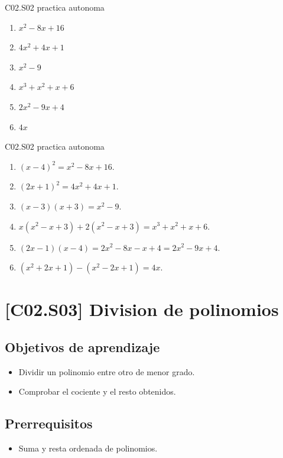 \begin{shortanswer}{C02.S02 practica autonoma}
\begin{enumerate}[label=\textbf{PX-C02.S02-\arabic*:}, leftmargin=*]
  \item \(x^2-8x+16\)
  \item \(4x^2+4x+1\)
  \item \(x^2-9\)
  \item \(x^3+x^2+x+6\)
  \item \(2x^2-9x+4\)
  \item \(4x\)
\end{enumerate}
\end{shortanswer}

\begin{fullsolution}{C02.S02 practica autonoma}
\begin{enumerate}[label=\textbf{PX-C02.S02-\arabic*:}, leftmargin=*]
  \item \((x-4)^2=x^2-8x+16\).
  \item \((2x+1)^2=4x^2+4x+1\).
  \item \((x-3)(x+3)=x^2-9\).
  \item \(x(x^2-x+3)+2(x^2-x+3)=x^3+x^2+x+6\).
  \item \((2x-1)(x-4)=2x^2-8x-x+4=2x^2-9x+4\).
  \item \((x^2+2x+1)-(x^2-2x+1)=4x\).
\end{enumerate}
\end{fullsolution}

\section{[C02.S03] Division de polinomios}

\subsection*{Objetivos de aprendizaje}
\begin{itemize}
  \item Dividir un polinomio entre otro de menor grado.
  \item Comprobar el cociente y el resto obtenidos.
\end{itemize}

\subsection*{Prerrequisitos}
\begin{itemize}
  \item Suma y resta ordenada de polinomios.
\end{itemize}

